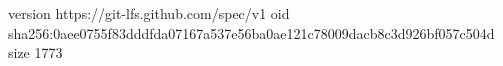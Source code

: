 version https://git-lfs.github.com/spec/v1
oid sha256:0aee0755f83dddfda07167a537e56ba0ae121c78009dacb8c3d926bf057c504d
size 1773
